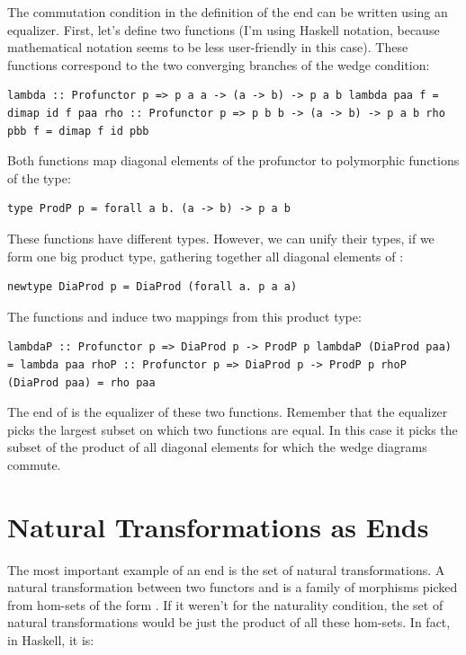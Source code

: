 The commutation condition in the definition of the end can be written
using an equalizer. First, let's define two functions (I'm using Haskell
notation, because mathematical notation seems to be less user-friendly
in this case). These functions correspond to the two converging branches
of the wedge condition:

\begin{verbatim}
lambda :: Profunctor p => p a a -> (a -> b) -> p a b lambda paa f = dimap id f paa rho :: Profunctor p => p b b -> (a -> b) -> p a b rho pbb f = dimap f id pbb
\end{verbatim}

Both functions map diagonal elements of the profunctor  to
polymorphic functions of the type:

\begin{verbatim}
type ProdP p = forall a b. (a -> b) -> p a b
\end{verbatim}

These functions have different types. However, we can unify their types,
if we form one big product type, gathering together all diagonal
elements of :

\begin{verbatim}
newtype DiaProd p = DiaProd (forall a. p a a)
\end{verbatim}

The functions  and  induce two mappings from
this product type:

\begin{verbatim}
lambdaP :: Profunctor p => DiaProd p -> ProdP p lambdaP (DiaProd paa) = lambda paa rhoP :: Profunctor p => DiaProd p -> ProdP p rhoP (DiaProd paa) = rho paa
\end{verbatim}

The end of  is the equalizer of these two functions. Remember
that the equalizer picks the largest subset on which two functions are
equal. In this case it picks the subset of the product of all diagonal
elements for which the wedge diagrams commute.

\section{Natural Transformations as
Ends}\label{natural-transformations-as-ends}

The most important example of an end is the set of natural
transformations. A natural transformation between two functors
 and  is a family of morphisms picked from hom-sets
of the form . If it weren't for the naturality
condition, the set of natural transformations would be just the product
of all these hom-sets. In fact, in Haskell, it is:

